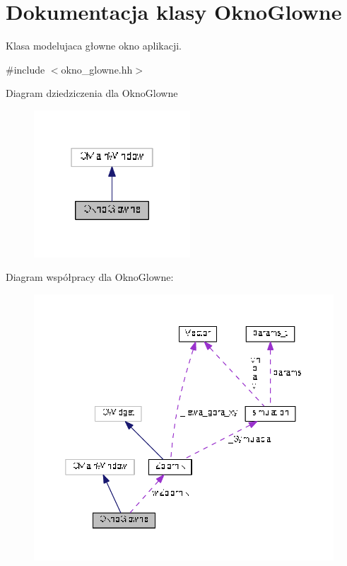 \hypertarget{class_okno_glowne}{}\section{Dokumentacja klasy Okno\+Glowne}
\label{class_okno_glowne}


Klasa modelujaca głowne okno aplikacji.  




{\ttfamily \#include $<$okno\+\_\+glowne.\+hh$>$}



Diagram dziedziczenia dla Okno\+Glowne\nopagebreak
\begin{figure}[H]
\begin{center}
\leavevmode
\includegraphics[width=166pt]{class_okno_glowne__inherit__graph}
\end{center}
\end{figure}


Diagram współpracy dla Okno\+Glowne\+:\nopagebreak
\begin{figure}[H]
\begin{center}
\leavevmode
\includegraphics[width=350pt]{class_okno_glowne__coll__graph}
\end{center}
\end{figure}

